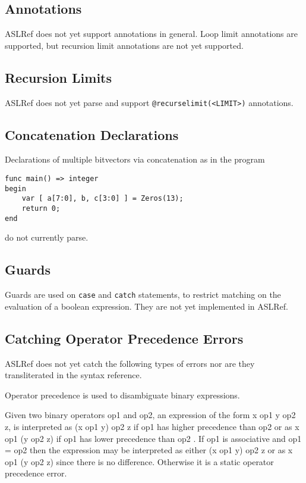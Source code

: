 \documentclass{book}
\begin{document}

\subsection{Annotations}
ASLRef does not yet support annotations in general.
Loop limit annotations are supported, but recursion limit annotations are not yet supported.

\subsection{Recursion Limits}
ASLRef does not yet parse and support \texttt{@recurselimit(<LIMIT>)} annotations.

\subsection{Concatenation Declarations}
Declarations of multiple bitvectors via concatenation as in the program
\begin{Verbatim}
func main() => integer
begin
    var [ a[7:0], b, c[3:0] ] = Zeros(13);
    return 0;
end
\end{Verbatim}
do not currently parse.


\subsection{Guards}

Guards are used on \texttt{case} and \texttt{catch} statements, to restrict
matching on the evaluation of a boolean expression.
%
They are not yet implemented in ASLRef.


\subsection{Catching Operator Precedence Errors}
ASLRef does not yet catch the following types of errors nor are they transliterated in the syntax reference.

Operator precedence is used to disambiguate binary expressions.

Given two binary operators op1 and op2, an expression of the form x op1 y op2 z, is interpreted as (x op1 y) op2 z
if op1 has higher precedence than op2 or as x op1 (y op2 z) if op1 has lower precedence than op2 . If op1 is
associative and op1 = op2 then the expression may be interpreted as either (x op1 y) op2 z or as x op1 (y op2 z)
since there is no difference. Otherwise it is a static operator precedence error.
\end{document}
